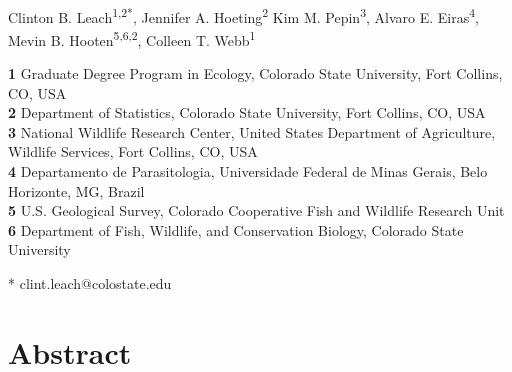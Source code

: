 \documentclass[10pt,letterpaper]{article}
\date{}
\begin{document}
\vspace*{0.2in}

\begin{flushleft}
{\Large
\textbf{}
}
\newline
\\
Clinton B. Leach\textsuperscript{1,2*},
Jennifer A. Hoeting\textsuperscript{2}
Kim M. Pepin\textsuperscript{3},
Alvaro E. Eiras\textsuperscript{4},
Mevin B. Hooten\textsuperscript{5,6,2},
Colleen T. Webb\textsuperscript{1}


\bigskip
\textbf{1} Graduate Degree Program in Ecology, Colorado State University, Fort Collins, CO, USA
\\
\textbf{2} Department of Statistics, Colorado State University, Fort Collins, CO, USA
\\
\textbf{3} National Wildlife Research Center, United States Department of Agriculture, Wildlife Services, Fort Collins, CO, USA
\\
\textbf{4} Departamento de Parasitologia, Universidade Federal de Minas Gerais, Belo Horizonte, MG, Brazil
\\
\textbf{5} U.S. Geological Survey, Colorado Cooperative Fish and Wildlife Research Unit
\\
\textbf{6} Department of Fish, Wildlife, and Conservation Biology, Colorado State University
\bigskip

% 


* clint.leach@colostate.edu

\end{flushleft}
\section*{Abstract}
\end{document}
